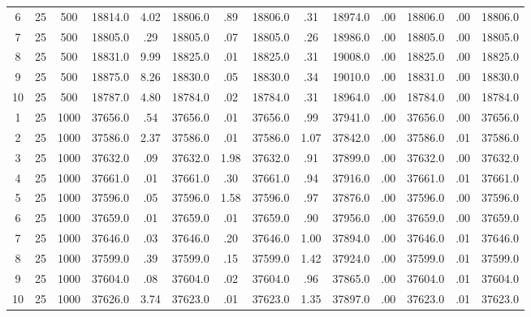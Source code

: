 \documentclass[12pt,a4paper]{article}
\begin{document}
\begin{center}
{\begin{tabular}{|ccc|cc|cc|cc|cc|cc|c|}
6             &  25& 500&  18814.0& 4.02&  18806.0&  .89&  18806.0&  .31&  18974.0&  .00&  18806.0&  .00&  18806.0\\[-0.01in]
7             &  25& 500&  18805.0&  .29&  18805.0&  .07&  18805.0&  .26&  18986.0&  .00&  18805.0&  .00&  18805.0\\[-0.01in]
8             &  25& 500&  18831.0& 9.99&  18825.0&  .01&  18825.0&  .31&  19008.0&  .00&  18825.0&  .00&  18825.0\\[-0.01in]
9             &  25& 500&  18875.0& 8.26&  18830.0&  .05&  18830.0&  .34&  19010.0&  .00&  18831.0&  .00&  18830.0\\[-0.01in]
10            &  25& 500&  18787.0& 4.80&  18784.0&  .02&  18784.0&  .31&  18964.0&  .00&  18784.0&  .00&  18784.0\\[-0.01in]
1             &  25&1000&  37656.0&  .54&  37656.0&  .01&  37656.0&  .99&  37941.0&  .00&  37656.0&  .00&  37656.0\\[-0.01in]
2             &  25&1000&  37586.0& 2.37&  37586.0&  .01&  37586.0& 1.07&  37842.0&  .00&  37586.0&  .01&  37586.0\\[-0.01in]
3             &  25&1000&  37632.0&  .09&  37632.0& 1.98&  37632.0&  .91&  37899.0&  .00&  37632.0&  .00&  37632.0\\[-0.01in]
4             &  25&1000&  37661.0&  .01&  37661.0&  .30&  37661.0&  .94&  37916.0&  .00&  37661.0&  .01&  37661.0\\[-0.01in]
5             &  25&1000&  37596.0&  .05&  37596.0& 1.58&  37596.0&  .97&  37876.0&  .00&  37596.0&  .00&  37596.0\\[-0.01in]
6             &  25&1000&  37659.0&  .01&  37659.0&  .01&  37659.0&  .90&  37956.0&  .00&  37659.0&  .00&  37659.0\\[-0.01in]
7             &  25&1000&  37646.0&  .03&  37646.0&  .20&  37646.0& 1.00&  37894.0&  .00&  37646.0&  .01&  37646.0\\[-0.01in]
8             &  25&1000&  37599.0&  .39&  37599.0&  .15&  37599.0& 1.42&  37924.0&  .00&  37599.0&  .01&  37599.0\\[-0.01in]
9             &  25&1000&  37604.0&  .08&  37604.0&  .02&  37604.0&  .96&  37865.0&  .00&  37604.0&  .01&  37604.0\\[-0.01in]
10            &  25&1000&  37626.0& 3.74&  37623.0&  .01&  37623.0& 1.35&  37897.0&  .00&  37623.0&  .01&  37623.0\\[-0.01in]
\hline
\end{tabular}
 }
\end{center}
\end{document}
